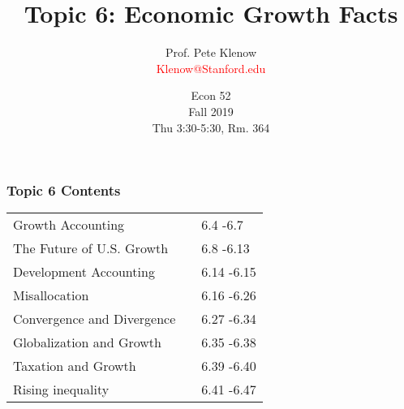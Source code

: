 \documentclass[serif,professionalfont,red,aspectratio=169]{beamer}
\begin{document}
\title{\textrm{Topic 6:
Economic Growth Facts }}
\author{Prof. Pete Klenow \\ \vspace{3mm} {\small }\textcolor{red}{Klenow@Stanford.edu}}
\date{Econ 52 \\ \vspace{3mm}Fall 2019\\ \vspace{3mm} {\small } Thu 3:30-5:30, Rm. 364}

\begin{frame}
\titlepage
\end{frame}

\begin{frame}[t]
\frametitle{Topic 6 Contents}
\begin{table}
\centering
    \begin{tabular}{l l l}
    \vspace{4mm}
 Growth Accounting&\hspace{30mm} &6.4 -6.7 
\\ \vspace{4mm}
The Future of U.S. Growth&\hspace{30mm} & 6.8 -6.13
\\ \vspace{4mm}
Development Accounting &\hspace{30mm}&6.14 -6.15 
\\ \vspace{4mm}
Misallocation&\hspace{30mm} & 6.16 -6.26
\\ \vspace{4mm}
Convergence and Divergence&\hspace{30mm}& 6.27 -6.34 
\\ \vspace{4mm}
Globalization and Growth&\hspace{30mm}&6.35 -6.38 
\\\vspace{4mm}
Taxation and Growth&\hspace{30mm}&6.39 -6.40 
\\\vspace{4mm}
Rising inequality&\hspace{30mm}&6.41 -6.47\\
    \end{tabular}
\end{table}
\end{frame}
\end{document}
